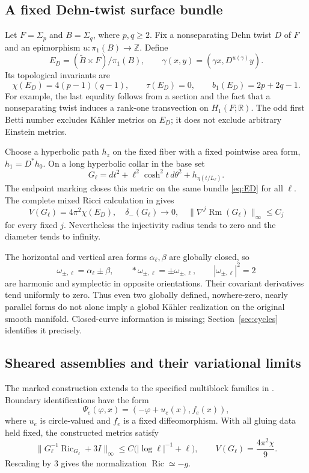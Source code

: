 \documentclass[11pt,a4paper]{article}
\theoremstyle{definition}\newtheorem{definition}[theorem]{Definition}
\theoremstyle{remark}\newtheorem{remark}[theorem]{Remark}
\DeclareMathOperator{\Ric}{Ric}
\DeclareMathOperator{\Rm}{Rm}
\newcommand{\R}{\mathbb R}
\newcommand{\Z}{\mathbb Z}
\begin{document}
\subsection{A fixed Dehn-twist surface bundle}
Let $F=\Sigma_p$ and $B=\Sigma_q$, where $p,q\ge2$. Fix a nonseparating Dehn twist $D$ of $F$ and an epimorphism $u:\pi_1(B)\to\Z$. Define
\begin{equation}\label{eq:ED}
 E_D=(\widetilde B\times F)/\pi_1(B),\qquad
 \gamma(x,y)=(\gamma x,D^{u(\gamma)}y).
\end{equation}
Its topological invariants are
\begin{equation}\label{eq:ED-top}
 \chi(E_D)=4(p-1)(q-1),\qquad \tau(E_D)=0,
 \qquad b_1(E_D)=2p+2q-1.
\end{equation}
For example, the last equality follows from a section and the fact that a nonseparating twist induces a rank-one transvection on $H_1(F;\R)$. The odd first Betti number excludes K\"ahler metrics on $E_D$; it does not exclude arbitrary Einstein metrics.

Choose a hyperbolic path $h_z$ on the fixed fiber with a fixed pointwise area form, $h_1=D^*h_0$. On a long hyperbolic collar in the base set
\begin{equation}\label{eq:slow-shear}
 G_\ell=dt^2+\ell^2\cosh^2t\,d\theta^2+
               h_{\eta(t/L_\ell)}.
\end{equation}
The endpoint marking closes this metric on the same bundle \eqref{eq:ED} for all $\ell$. The complete mixed Ricci calculation in \cite{source-construction,source-cycles} gives
\begin{equation}\label{eq:ED-approx}
 V(G_\ell)=4\pi^2\chi(E_D),\quad
 \delta_-(G_\ell)\longrightarrow0,\quad
 \|\nabla^j\Rm(G_\ell)\|_\infty\le C_j
\end{equation}
for every fixed $j$. Nevertheless the injectivity radius tends to zero and the diameter tends to infinity.

The horizontal and vertical area forms $\alpha_\ell,\beta$ are globally closed, so
\[
 \omega_{\pm,\ell}=\alpha_\ell\pm\beta,
 \qquad *\omega_{\pm,\ell}=\pm\omega_{\pm,\ell},
 \qquad |\omega_{\pm,\ell}|^2=2
\]
are harmonic and symplectic in opposite orientations. Their covariant derivatives tend uniformly to zero. Thus even two globally defined, nowhere-zero, nearly parallel forms do not alone imply a global K\"ahler realization on the original smooth manifold. Closed-curve information is missing; Section~\ref{sec:cycles} identifies it precisely.

\subsection{Sheared assemblies and their variational limits}
The marked construction extends to the specified multiblock families in \cite{source-construction}. Boundary identifications have the form
\[
 \Psi_e(\varphi,x)=(-\varphi+u_e(x),f_e(x)),
\]
where $u_e$ is circle-valued and $f_e$ is a fixed diffeomorphism. With all gluing data held fixed, the constructed metrics satisfy
\[
 \|G_\ell^{-1}\Ric_{G_\ell}+3I\|_\infty
       \le C\bigl(|\log\ell|^{-1}+\ell\bigr),
 \qquad V(G_\ell)=\frac{4\pi^2\chi}{9}.
\]
Rescaling by $3$ gives the normalization $\Ric\simeq-g$.
\end{document}
